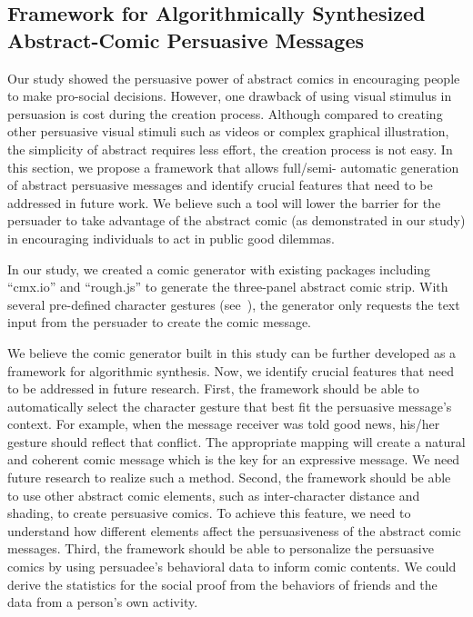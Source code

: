 
 \subsection{Framework for Algorithmically Synthesized Abstract-Comic Persuasive Messages}
 \label{sub:framework}
 
Our study showed the persuasive power of abstract comics in encouraging people to make pro-social decisions. However, one drawback of using visual stimulus in persuasion is cost during the creation process. Although compared to creating other persuasive visual stimuli such as videos or complex graphical illustration, the simplicity of abstract requires less effort, the creation process is not easy. In this section, we propose a framework that allows full/semi- automatic generation of abstract persuasive messages and identify crucial features that need to be addressed in future work. We believe such a tool will lower the barrier for the persuader to take advantage of the abstract comic (as demonstrated in our study) in encouraging individuals to act in public good dilemmas.

In our study, we created a comic generator with existing packages including ``cmx.io'' \cite{cmx.io} and ``rough.js'' \cite{rough.js} to generate the three-panel abstract comic strip. With several pre-defined character gestures (see~), the generator only requests the text input from the persuader to create the comic message.  

We believe the comic generator built in this study can be further developed as a framework for algorithmic synthesis. Now, we identify crucial features that need to be addressed in future research. First, the framework should be able to automatically select the character gesture that best fit the persuasive message's context. For example, when the message receiver was told good news, his/her gesture should reflect that conflict. The appropriate mapping will create a natural and coherent comic message which is the key for an expressive message. We need future research to realize such a method. Second, the framework should be able to use other abstract comic elements, such as inter-character distance and shading, to create persuasive comics. To achieve this feature, we need to understand how different elements affect the persuasiveness of the abstract comic messages. Third, the framework should be able to personalize the persuasive comics by using persuadee's behavioral data to inform comic contents. We could derive the statistics for the social proof from the behaviors of friends and the data from a person's own activity.

